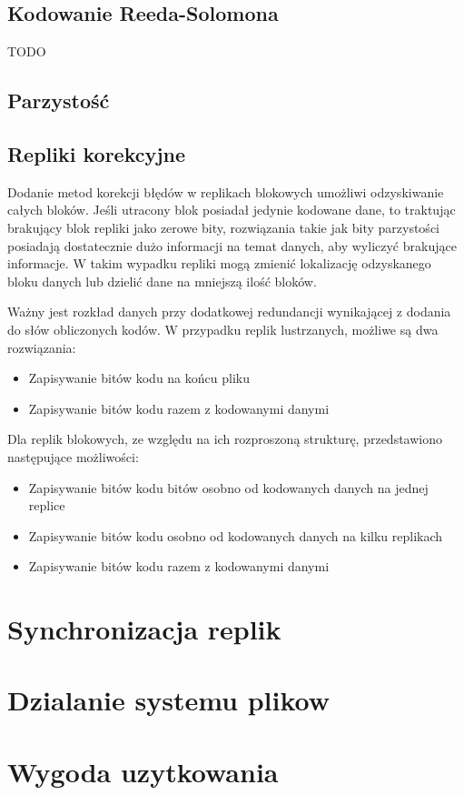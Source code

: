 \subsection{Kodowanie Reeda-Solomona}
TODO
\subsection{Parzystość}
\subsection{Repliki korekcyjne}

Dodanie metod korekcji błędów w replikach blokowych umożliwi odzyskiwanie całych bloków. Jeśli utracony blok posiadał jedynie kodowane dane, to traktując brakujący blok repliki jako zerowe bity, rozwiązania takie jak bity parzystości posiadają dostatecznie dużo informacji na temat danych, aby wyliczyć brakujące informacje. W takim wypadku repliki mogą zmienić lokalizację odzyskanego bloku danych lub dzielić dane na mniejszą ilość bloków. 

Ważny jest rozkład danych przy dodatkowej redundancji wynikającej z dodania do słów obliczonych kodów. W przypadku replik lustrzanych, możliwe są dwa rozwiązania:
\begin{itemize}
        \item Zapisywanie bitów kodu na końcu pliku
        \item Zapisywanie bitów kodu razem z kodowanymi danymi
\end{itemize}
Dla replik blokowych, ze względu na ich rozproszoną strukturę, przedstawiono następujące możliwości:
\begin{itemize}
        \item Zapisywanie bitów kodu bitów osobno od kodowanych danych na jednej replice
        \item Zapisywanie bitów kodu osobno od kodowanych danych na kilku replikach
        \item Zapisywanie bitów kodu razem z kodowanymi danymi
\end{itemize}



\section {Synchronizacja replik}

\section {Dzialanie systemu plikow}

\section {Wygoda uzytkowania}
